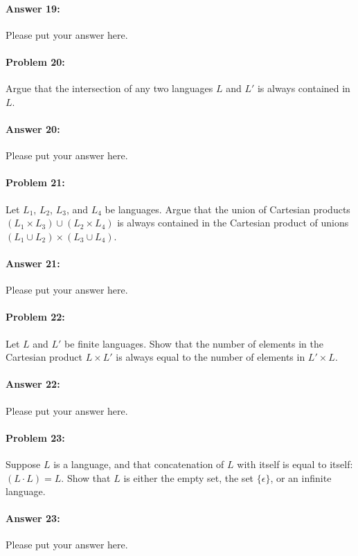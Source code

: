 \documentclass[10pt]{article}
\begin{document}
\paragraph{Answer 19:} Please put your answer here.

\noindent\hrulefill %

\paragraph{Problem 20:}
Argue that the intersection of any two languages $L$ and $L'$ is always
contained in $L$.

\paragraph{Answer 20:} Please put your answer here.

\noindent\hrulefill %

\paragraph{Problem 21:}
Let $L_1$, $L_2$, $L_3$, and $L_4$ be languages. Argue that the union
of Cartesian products $(L_1 \times L_3) \cup (L_2 \times L_4)$ is
always contained in the Cartesian product of unions
$(L_1 \cup L_2) \times (L_3 \cup L_4)$.

\paragraph{Answer 21:} Please put your answer here.

\noindent\hrulefill %

\paragraph{Problem 22:}
Let $L$ and $L'$ be finite languages. Show that the number of elements
in the Cartesian product $L \times L'$ is always equal to the number
of elements in $L' \times L$.

\paragraph{Answer 22:} Please put your answer here.

\noindent\hrulefill %

\paragraph{Problem 23:}

Suppose $L$ is a language, and that concatenation of $L$ with itself is equal to itself:
$(L\cdot L) = L$. Show that $L$ is either the empty set, 
the set $\{\epsilon\}$, or an infinite language.

\paragraph{Answer 23:} Please put your answer here.
\end{document}
